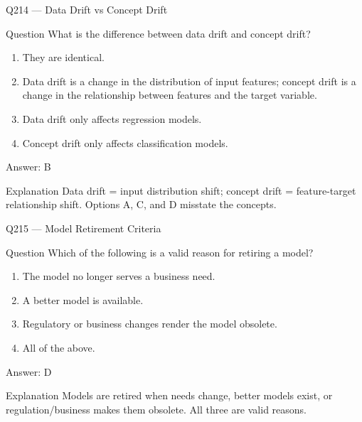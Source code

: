 \documentclass[aspectratio=169,8pt]{beamer}
\begin{document}
																					\begin{frame}{Q214 --- Data Drift vs Concept Drift}
																						\begin{block}{Question}
																							What is the difference between data drift and concept drift?
																							\begin{enumerate}
																								\item They are identical.
																								\item Data drift is a change in the distribution of input features; concept drift is a change in the relationship between features and the target variable.
																								\item Data drift only affects regression models.
																								\item Concept drift only affects classification models.
																							\end{enumerate}  \end{block}
																							\begin{exampleblock}{Answer: B}\end{exampleblock}
																							\begin{block}{Explanation}
																								Data drift = input distribution shift; concept drift = feature-target relationship shift. Options A, C, and D misstate the concepts.
																							\end{block}
																						\end{frame}
																						
																						\begin{frame}{Q215 --- Model Retirement Criteria}
																							\begin{block}{Question}
																								Which of the following is a valid reason for retiring a model?
																								\begin{enumerate}
																									\item The model no longer serves a business need.
																									\item A better model is available.
																									\item Regulatory or business changes render the model obsolete.
																									\item All of the above.
																								\end{enumerate}  \end{block}
																								\begin{exampleblock}{Answer: D}\end{exampleblock}
																								\begin{block}{Explanation}
																									Models are retired when needs change, better models exist, or regulation/business makes them obsolete. All three are valid reasons.
																								\end{block}
																							\end{frame}
																							
\end{document}
